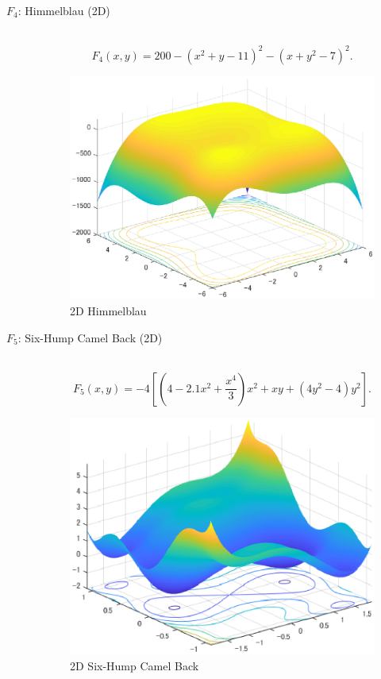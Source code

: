 \documentclass[a4j,11pt]{jarticle}
\begin{document}
\begin{description}
\item[$F_4$: Himmelblau (2D)]\mbox{}\\
\begin{equation}
\label{eq:F4}
F_4(x,y) = 200 - (x^2+y-11)^2 - (x+y^2-7)^2.
\end{equation}
\begin{figure}[h]
\centering
\includegraphics[width=0.8\linewidth]{eps/F4.eps}
\caption{2D Himmelblau}
\label{fig:f4}
\end{figure}

\item[$F_5$: Six-Hump Camel Back (2D)]\mbox{}\\
\begin{equation}
\label{eq:F5}
F_5(x,y)=-4[(4-2.1x^2+\frac{x^4}{3})x^2+xy+(4y^2-4)y^2].
\end{equation}
\begin{figure}[h]
\centering
\includegraphics[width=0.8\linewidth]{eps/F5.eps}
\caption{2D Six-Hump Camel Back}
\label{fig:f5}
\end{figure}


\end{description}
\end{document}
